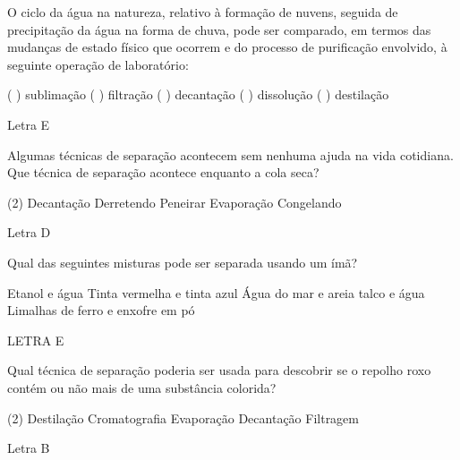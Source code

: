 \documentclass[11pt]{article}
\author{fabio}
\date{\today}
\title{}
\begin{document}
\tableofcontents


\begin{exercise}
O ciclo da água na natureza, relativo à formação de nuvens, seguida de precipitação da água na forma de chuva, pode ser comparado, em termos das mudanças de estado físico que ocorrem e do processo de purificação envolvido, à seguinte operação de laboratório:

\begin{choice}
\choice (\; ) sublimação
\choice (\; ) filtração
\choice (\; ) decantação
\choice (\; ) dissolução
\choice (\; ) destilação
\end{choice}
\end{exercise}
\begin{solution}
Letra E
\end{solution}


\begin{exercise}
Algumas técnicas de separação acontecem sem nenhuma ajuda na vida cotidiana. Que técnica de separação acontece enquanto a cola seca?

\begin{choice}(2)
\choice Decantação
\choice Derretendo
\choice Peneirar
\choice Evaporação
\choice Congelando
\end{choice}
\end{exercise}
\begin{solution}
Letra D
\end{solution}




\begin{exercise}
Qual das seguintes misturas pode ser separada usando um ímã?
\begin{choice}
\choice Etanol e água
\choice Tinta vermelha e tinta azul
\choice Água do mar e areia
\choice talco e água
\choice Limalhas de ferro e enxofre em pó
\end{choice}
\end{exercise}
\begin{solution}
LETRA E
\end{solution}





\begin{exercise}
Qual técnica de separação poderia ser usada para descobrir se o repolho roxo contém ou não mais de uma substância colorida?

\begin{choice}(2)
\choice Destilação
\choice Cromatografia
\choice Evaporação
\choice Decantação
\choice Filtragem
\end{choice}
\end{exercise}
\begin{solution}
Letra B
\end{solution}
\end{document}
